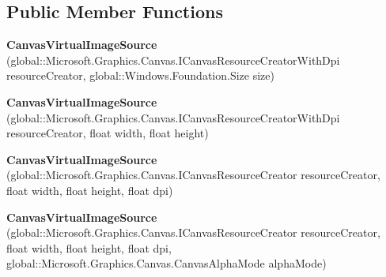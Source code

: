 \subsection*{Public Member Functions}
\begin{DoxyCompactItemize}
\item 
\mbox{\label{class_microsoft_1_1_graphics_1_1_canvas_1_1_u_i_1_1_xaml_1_1_canvas_virtual_image_source_aebcca3188e39dcafae53146219d289c9}} 
{\bfseries Canvas\+Virtual\+Image\+Source} (global\+::\+Microsoft.\+Graphics.\+Canvas.\+I\+Canvas\+Resource\+Creator\+With\+Dpi resource\+Creator, global\+::\+Windows.\+Foundation.\+Size size)
\item 
\mbox{\label{class_microsoft_1_1_graphics_1_1_canvas_1_1_u_i_1_1_xaml_1_1_canvas_virtual_image_source_a8b810e5a0a07f77ef3ac71a77e4bb2b9}} 
{\bfseries Canvas\+Virtual\+Image\+Source} (global\+::\+Microsoft.\+Graphics.\+Canvas.\+I\+Canvas\+Resource\+Creator\+With\+Dpi resource\+Creator, float width, float height)
\item 
\mbox{\label{class_microsoft_1_1_graphics_1_1_canvas_1_1_u_i_1_1_xaml_1_1_canvas_virtual_image_source_ae338bb104e07429d6161b64bada335db}} 
{\bfseries Canvas\+Virtual\+Image\+Source} (global\+::\+Microsoft.\+Graphics.\+Canvas.\+I\+Canvas\+Resource\+Creator resource\+Creator, float width, float height, float dpi)
\item 
\mbox{\label{class_microsoft_1_1_graphics_1_1_canvas_1_1_u_i_1_1_xaml_1_1_canvas_virtual_image_source_a8b703980e00fce9ea6161cf83fea05af}} 
{\bfseries Canvas\+Virtual\+Image\+Source} (global\+::\+Microsoft.\+Graphics.\+Canvas.\+I\+Canvas\+Resource\+Creator resource\+Creator, float width, float height, float dpi, global\+::\+Microsoft.\+Graphics.\+Canvas.\+Canvas\+Alpha\+Mode alpha\+Mode)
\item 
\mbox{\label{class_microsoft_1_1_graphics_1_1_canvas_1_1_u_i_1_1_xaml_1_1_canvas_virtual_image_source_a0b38413571f933a578e7b1e5d5956b0d}} 

\end{DoxyCompactItemize}
